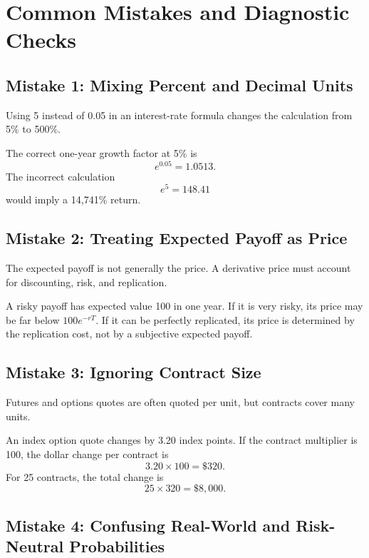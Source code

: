 \section{Common Mistakes and Diagnostic Checks}

\subsection{Mistake 1: Mixing Percent and Decimal Units}

Using 5 instead of 0.05 in an interest-rate formula changes the calculation from
5\% to 500\%.

\begin{exmp}
The correct one-year growth factor at 5\% is
\[
    e^{0.05}=1.0513.
\]
The incorrect calculation
\[
    e^5=148.41
\]
would imply a 14,741\% return.
\end{exmp}

\subsection{Mistake 2: Treating Expected Payoff as Price}

The expected payoff is not generally the price. A derivative price must account
for discounting, risk, and replication.

\begin{exmp}
A risky payoff has expected value 100 in one year. If it is very risky, its
price may be far below $100e^{-rT}$. If it can be perfectly replicated, its price
is determined by the replication cost, not by a subjective expected payoff.
\end{exmp}

\subsection{Mistake 3: Ignoring Contract Size}

Futures and options quotes are often quoted per unit, but contracts cover many
units.

\begin{exmp}
An index option quote changes by 3.20 index points. If the contract multiplier is
100, the dollar change per contract is
\[
    3.20\times 100=\$320.
\]
For 25 contracts, the total change is
\[
    25\times 320=\$8{,}000.
\]
\end{exmp}

\subsection{Mistake 4: Confusing Real-World and Risk-Neutral Probabilities}

